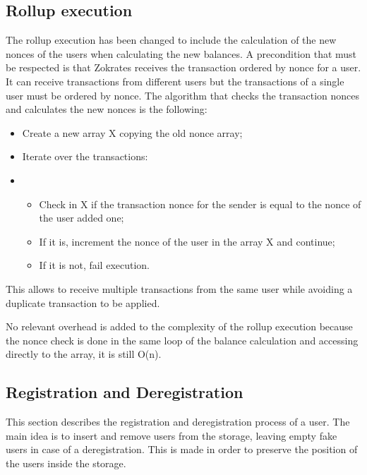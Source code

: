 \subsection{Rollup execution}

The rollup execution has been changed to include the calculation of the new nonces of the users when calculating the new balances.
A precondition that must be respected is that Zokrates receives the transaction ordered by nonce for a user. It can receive transactions from different users but the transactions of a single user must be ordered by nonce. The algorithm that checks the transaction nonces and calculates the new nonces is the following:
\begin{itemize}
	\item Create a new array X copying the old nonce array;
	\item Iterate over the transactions:
	\item \begin{itemize}
		\item Check in X if the transaction nonce for the sender is equal to the nonce of the user added one;
		\item If it is, increment the nonce of the user in the array X and continue;
		\item If it is not, fail execution.
    \end{itemize}
\end{itemize}

This allows to receive multiple transactions from the same user while avoiding a duplicate transaction to be applied.

No relevant overhead is added to the complexity of the rollup execution because the nonce check is done in the same loop of the balance calculation and accessing directly to the array, it is still O(n).



\subsection{Registration and Deregistration}

This section describes the registration and deregistration process of a user. The main idea is to insert and remove users from the storage, leaving empty fake users in case of a deregistration. This is made in order to preserve the position of the users inside the storage.
\label{subsec:registration}

